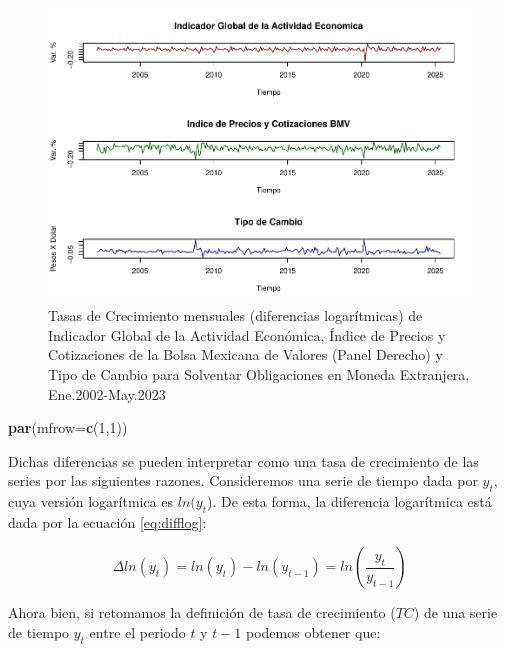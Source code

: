 \documentclass[
]{book}
\newenvironment{Shaded}{\begin{snugshade}}{\end{snugshade}}
\newcommand{\AttributeTok}[1]{\textcolor[rgb]{0.13,0.29,0.53}{#1}}
\newcommand{\DecValTok}[1]{\textcolor[rgb]{0.00,0.00,0.81}{#1}}
\newcommand{\FunctionTok}[1]{\textcolor[rgb]{0.13,0.29,0.53}{\textbf{#1}}}
\newcommand{\NormalTok}[1]{#1}
\begin{document}
\begin{figure}

{\centering \includegraphics{Notas-Series-Tiempo_files/figure-latex/fig5-1} 

}

\caption{Tasas de Crecimiento mensuales (diferencias logarítmicas) de Indicador Global de la Actividad Económica, Índice de Precios y Cotizaciones de la Bolsa Mexicana de Valores (Panel Derecho) y Tipo de Cambio para Solventar Obligaciones en Moneda Extranjera, Ene.2002-May.2023}\label{fig:fig5}
\end{figure}

\begin{Shaded}
\begin{Highlighting}[]
\FunctionTok{par}\NormalTok{(}\AttributeTok{mfrow=}\FunctionTok{c}\NormalTok{(}\DecValTok{1}\NormalTok{,}\DecValTok{1}\NormalTok{))}
\end{Highlighting}
\end{Shaded}

Dichas diferencias se pueden interpretar como una tasa de crecimiento de las series por las siguientes razones. Consideremos una serie de tiempo dada por \(y_t\), cuya versión logarítmica es \(ln(y_t\)). De esta forma, la diferencia logarítmica está dada por la ecuación \eqref{eq:difflog}:

\begin{equation}
   \Delta ln(y_t) = ln(y_t) - ln(y_{t-1}) = ln \left( \frac{y_t}{y_{t-1}} \right)
   \label{eq:difflog}
\end{equation}

Ahora bien, si retomamos la definición de tasa de crecimiento (\(TC\)) de una serie de tiempo \(y_t\) entre el periodo \(t\) y \(t-1\) podemos obtener que:
\end{document}
